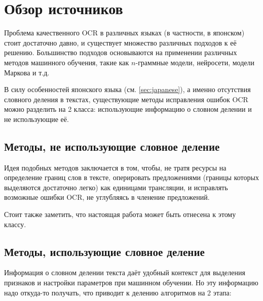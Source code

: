 \section{ Обзор источников }\label{sec:litreview}

Проблема качественного OCR в различных языках (в частности, в японском) стоит достаточно давно, и существует множество различных подходов к её решению. Большинство подходов основываются на применении различных методов машинного обучения, такие как $n$-граммные модели, нейросети, модели Маркова и т.д. 

В силу особенностей японского языка (см. \cref{sec:japanese}), а именно отсутствия словного деления в текстах, существующие методы исправления ошибок OCR можно разделить на 2 класса: использующие информацию о словном делении и не использующие её.

\subsection{ Методы, не использующие словное деление }

Идея подобных методов заключается в том, чтобы, не тратя ресурсы на определение границ слов в тексте, оперировать предложениями (границы которых выделяются достаточно легко) как единицами трансляции, и исправлять возможные ошибки OCR, не углубляясь в членение предложений.


Стоит также заметить, что настоящая работа может быть отнесена к этому классу.

\subsection{ Методы, использующие словное деление }

Информация о словном делении текста даёт удобный контекст для выделения признаков и настройки параметров при машинном обучении. Но эту информацию надо откуда-то получать, что приводит к делению алгоритмов на 2 этапа:

